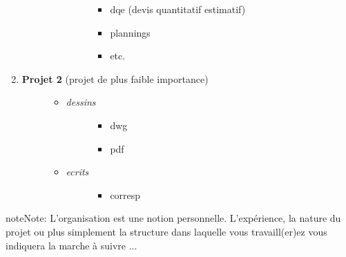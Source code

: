 \documentclass[a4paper,12pt,french]{sphinxmanual}
\begin{document}
\begin{enumerate}
\begin{description}
\begin{itemize}
\begin{description}
\begin{itemize}
\item {} 
dqe (devis quantitatif estimatif)

\item {} 
plannings

\item {} 
etc.

\end{itemize}

\end{description}

\end{itemize}

\end{description}

\item {} \begin{description}
\item[{\textbf{Projet 2} (projet de plus faible importance)}] \leavevmode\begin{itemize}
\item {} \begin{description}
\item[{\emph{dessins}}] \leavevmode\begin{itemize}
\item {} 
dwg

\item {} 
pdf

\end{itemize}

\end{description}

\item {} \begin{description}
\item[{\emph{ecrits}}] \leavevmode\begin{itemize}
\item {} 
corresp

\end{itemize}

\end{description}

\end{itemize}

\end{description}

\end{enumerate}

\begin{notice}{note}{Note:}
L'organisation est une notion personnelle. L'expérience, la nature du projet ou plus simplement la structure dans laquelle vous travaill(er)ez vous indiquera la marche à suivre ...
\end{notice}
\end{document}
